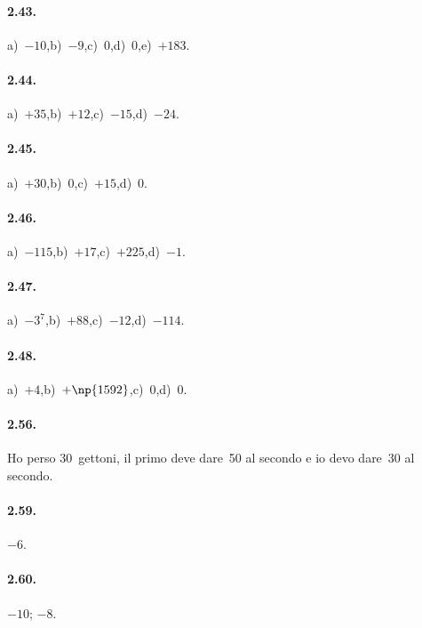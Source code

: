 \paragraph{2.43.}
a)~$-10$,\quad b)~$-9$,\quad c)~$0$,\quad d)~$0$,\quad e)~$+183$.

\paragraph{2.44.}
a)~$+35$,\quad b)~$+12$,\quad c)~$-15$,\quad d)~$-24$.

\paragraph{2.45.}
a)~$+30$,\quad b)~$0$,\quad c)~$+15$,\quad d)~$0$.

\paragraph{2.46.}
a)~$-115$,\quad b)~$+17$,\quad c)~$+225$,\quad d)~$-1$.

\paragraph{2.47.}
a)~$-3^7$,\quad b)~$+88$,\quad c)~$-12$,\quad d)~$-114$.

\paragraph{2.48.}
a)~$+4$,\quad b)~$+\np{1592}$,\quad c)~$0$,\quad d)~$0$.

\paragraph{2.56.}
Ho perso 30~gettoni, il primo deve dare~50 al secondo e io devo dare~30 al secondo.

\paragraph{2.59.}
$-6$\textdegree.

\paragraph{2.60.}
$-10$; $-8$.
